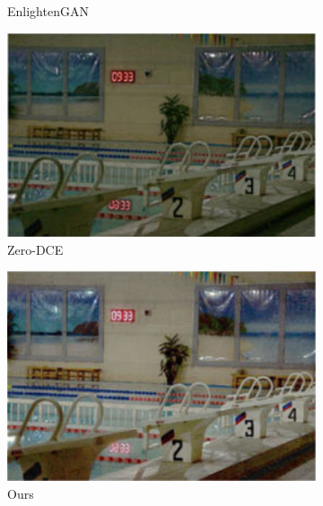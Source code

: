 \documentclass[a4paper]{ctexart}
\begin{document}
\begin{figure}[htb]
\begin{subfigure}{0.19\textwidth}
		\captionsetup{font=scriptsize}
		\caption{EnlightenGAN}
		\label{fig: EnlightenGAN}	
	\end{subfigure}
	\begin{subfigure}{0.19\textwidth}
		\includegraphics[width=\linewidth]{picture/LLIE/Efficent/Zero-DCE}
		\captionsetup{font=scriptsize}
		\caption{Zero-DCE}
		\label{fig: Zero-DCE}	
	\end{subfigure}
	\begin{subfigure}{0.19\textwidth}
		\includegraphics[width=\linewidth]{picture/LLIE/Efficent/Ours}
		\captionsetup{font=scriptsize}
		\caption{Ours}
		\label{fig: Ours}	
	\end{subfigure}
	\begin{subfigure}{0.19\textwidth}

\end{subfigure}
\end{figure}
\end{document}
